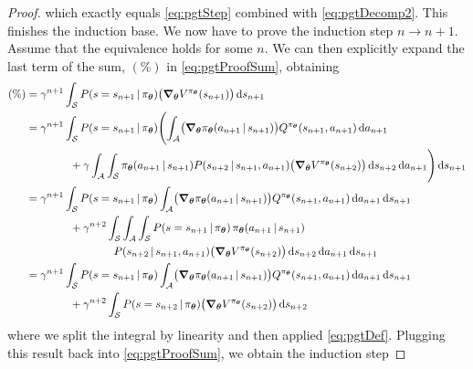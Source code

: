\begin{proof}
			which exactly equals \eqref{eq:pgtStep} combined with \eqref{eq:pgtDecomp2}. This finishes the induction base. We now have to prove the induction step \( n \to n + 1 \). Assume that the equivalence holds for some \(n\). We can then explicitly expand the last term of the sum, \((\%)\) in \eqref{eq:pgtProofSum}, obtaining
			\begin{align}
				(\%)
					&= \gamma^{n + 1} \int_\mathcal{S} P(s = s_{n + 1} \,\vert\, \pi_{\bm{\theta}}) \bigl( \grad_{\bm{\theta}} V^{\pi_{\bm{\theta}}}(s_{n + 1}) \bigr) \dd{s_{n + 1}} \\
					&= \gamma^{n + 1} \int_\mathcal{S} P(s = s_{n + 1} \,\vert\, \pi_{\bm{\theta}}) \Biggl( \int_\mathcal{A} \bigl( \grad_{\bm{\theta}} \pi_{\bm{\theta}}(a_{n + 1} \,\vert\, s_{n + 1}) \bigr) Q^{\pi_{\bm{\theta}}}(s_{n + 1}, a_{n + 1}) \dd{a_{n + 1}} \\&\qquad\qquad
						+ \gamma \int_\mathcal{A} \int_\mathcal{S} \pi_{\bm{\theta}}(a_{n + 1} \,\vert\, s_{n + 1}) P(s_{n + 2} \,\vert\, s_{n + 1}, a_{n + 1}) \bigl( \grad_{\bm{\theta}} V^{\pi_{\bm{\theta}}}(s_{n + 2}) \bigr) \dd{s_{n + 2}} \dd{a_{n + 1}} \Biggr) \dd{s_{n + 1}} \\
					&= \gamma^{n + 1} \int_\mathcal{S} P(s = s_{n + 1} \,\vert\, \pi_{\bm{\theta}}) \int_\mathcal{A} \bigl( \grad_{\bm{\theta}} \pi_{\bm{\theta}}(a_{n + 1} \,\vert\, s_{n + 1}) \bigr) Q^{\pi_{\bm{\theta}}}(s_{n + 1}, a_{n + 1}) \dd{a_{n + 1}} \dd{s_{n + 1}} \\&\qquad\qquad
						+ \gamma^{n + 2} \int_\mathcal{S} \int_\mathcal{A} \int_\mathcal{S} P(s = s_{n + 1} \,\vert\, \pi_{\bm{\theta}}) \, \pi_{\bm{\theta}}(a_{n + 1} \,\vert\, s_{n + 1}) \\&\qquad\qquad\qquad\qquad
						  P(s_{n + 2} \,\vert\, s_{n + 1}, a_{n + 1}) \bigl( \grad_{\bm{\theta}} V^{\pi_{\bm{\theta}}}(s_{n + 2}) \bigr) \dd{s_{n + 2}} \dd{a_{n + 1}} \dd{s_{n + 1}} \\
					&= \gamma^{n + 1} \int_\mathcal{S} P(s = s_{n + 1} \,\vert\, \pi_{\bm{\theta}}) \int_\mathcal{A} \bigl( \grad_{\bm{\theta}} \pi_{\bm{\theta}}(a_{n + 1} \,\vert\, s_{n + 1}) \bigr) Q^{\pi_{\bm{\theta}}}(s_{n + 1}, a_{n + 1}) \dd{a_{n + 1}} \dd{s_{n + 1}} \\&\qquad\qquad
						+ \gamma^{n + 2} \int_\mathcal{S} P(s = s_{n + 2} \,\vert\, \pi_{\bm{\theta}}) \bigl( \grad_{\bm{\theta}} V^{\pi_{\bm{\theta}}}(s_{n + 2}) \bigr) \dd{s_{n + 2}}
			\end{align}
			where we split the integral by linearity and then applied \eqref{eq:pgtDef}. Plugging this result back into \eqref{eq:pgtProofSum}, we obtain the induction step

\end{proof}
